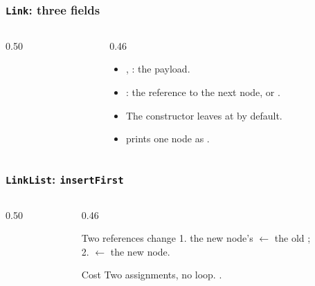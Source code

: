 \documentclass[aspectratio=169,10pt,compress]{beamer}
\begin{document}
\begin{frame}[t,fragile] \frametitle{\texttt{Link}: three fields}
  \begin{columns}[T]
    \begin{column}{0.50\textwidth}
    \end{column}
    \begin{column}{0.46\textwidth}
      \begin{itemize}\small
        \item {}, : the payload.
        \item {}: the reference to the next node, or .
        \item The constructor leaves  at  by default.
        \item {} prints one node as .
      \end{itemize}
    \end{column}
  \end{columns}
\end{frame}





\begin{frame}[t,fragile] \frametitle{\texttt{LinkList}: \texttt{insertFirst}}
  \begin{columns}[T]
    \begin{column}{0.50\textwidth}
    \end{column}
    \begin{column}{0.46\textwidth}
      \begin{block}{Two references change}
        \small
        1. the new node's  $\gets$ the old ;\\
        2.  $\gets$ the new node.
      \end{block}
      \begin{block}{Cost}
        \small
        Two assignments, no loop. .
      \end{block}
    \end{column}
  \end{columns}
\end{frame}
\end{document}
